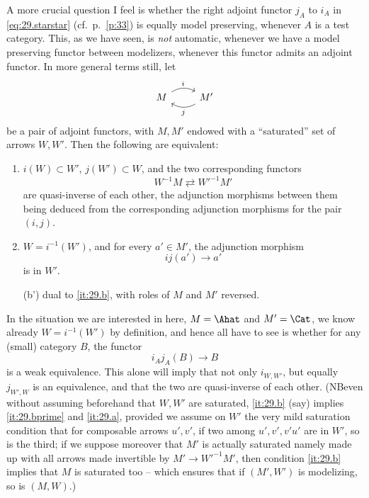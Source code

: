 A more crucial question I feel is whether the right adjoint functor
$j_A$ to $i_A$ in \eqref{eq:29.starstar}
(cf.\ p.~\ref{p:33}) is equally
model preserving, whenever $A$ is a test category. This, as we have
seen, is \emph{not} automatic, whenever we have a model preserving
functor between modelizers, whenever this functor admits an adjoint
functor. In more general terms still, let
\[
\begin{tikzcd}
  M \ar[r, bend left, "i"] & M' \ar[l, bend left, "j"] 
\end{tikzcd}\]
be a pair of adjoint functors, with $M,M'$ endowed with a
``saturated'' set of arrows $W,W'$. Then the following
are equivalent:
\begin{enumerate}[label=(\alph*)]
\item\label{it:29.a}
  $i(W)\subset W'$, $j(W')\subset W$, and the two corresponding
  functors
  \[  W^{-1}M \rightleftarrows W'^{-1}M' \]
  are quasi-inverse of each other, the adjunction morphisms between
  them being deduced from the corresponding adjunction morphisms for
  the pair $(i,j)$.
\item\label{it:29.b}
  $W=i^{-1}(W')$, and for every $a'\in M'$, the adjunction morphism
  \[ ij(a') \to a'\]
  is in $W'$.
\item[(b')]\label{it:29.bprime}
  dual to \ref{it:29.b}, with roles of $M$ and $M'$ reversed.
\end{enumerate}
In the situation we are interested in here, $M = \Ahat$ and
$M'=\Cat$, we know already $W=i^{-1}(W')$ by definition, and hence all
have to see is whether for any (small) category $B$, the functor
\begin{equation}
  \label{eq:29.T}
  i_Aj_A(B) \to B \tag{T}
\end{equation}
is a weak equivalence. This alone will imply that not only $i_{W,W'}$,
but equally $j_{W',W}$ is an equivalence, and that the two are
quasi-inverse of each other. (NB\enspace even without assuming beforehand that
$W,W'$ are saturated, \ref{it:29.b} (say) implies \ref{it:29.bprime}
and \ref{it:29.a}, provided we assume on $W'$ the very mild saturation
condition that for composable arrows $u',v'$, if two among
$u',v',v'u'$ are in $W'$, so is the third; if we suppose moreover that
$M'$ is actually saturated namely made up with all arrows made
invertible by $M' \to W'^{-1}M'$, then condition \ref{it:29.b} implies
that $M$ is saturated too -- which ensures that if $(M',W')$ is
modelizing, so is $(M,W)$.)

